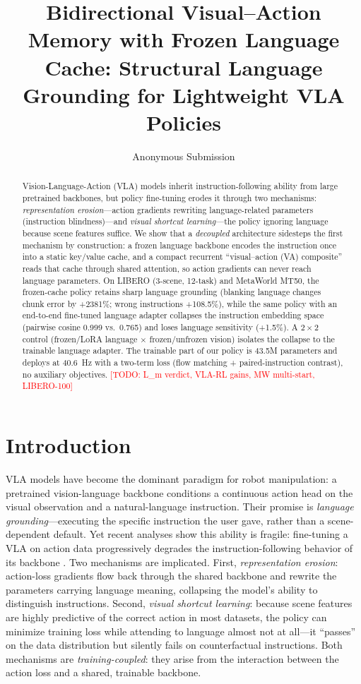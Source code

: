 \documentclass[10pt,twocolumn]{article}
\title{Bidirectional Visual--Action Memory with Frozen Language Cache:
Structural Language Grounding for Lightweight VLA Policies}
\author{Anonymous Submission}
\newcommand{\todo}[1]{\textcolor{red}{[TODO: #1]}}
\begin{document}
\maketitle

\begin{abstract}
Vision-Language-Action (VLA) models inherit instruction-following ability from
large pretrained backbones, but policy fine-tuning erodes it through two
mechanisms: \emph{representation erosion}---action gradients rewriting
language-related parameters (instruction blindness)---and \emph{visual
shortcut learning}---the policy ignoring language because scene features
suffice. We show that a \emph{decoupled} architecture sidesteps the first
mechanism by construction: a frozen language backbone encodes the instruction
once into a static key/value cache, and a compact recurrent
``visual--action (VA) composite'' reads that cache through shared attention,
so action gradients can never reach language parameters. On LIBERO (3-scene,
12-task) and MetaWorld MT50, the frozen-cache policy retains sharp language
grounding (blanking language changes chunk error by +2381\%; wrong
instructions +108.5\%), while the same policy with an end-to-end fine-tuned
language adapter collapses the instruction embedding space (pairwise cosine
0.999 vs.\ 0.765) and loses language sensitivity (+1.5\%). A $2\times2$
control (frozen/LoRA language $\times$ frozen/unfrozen vision) isolates the
collapse to the trainable language adapter. The trainable part of our policy
is 43.5M parameters and deploys at 40.6~Hz with a two-term loss
(flow matching + paired-instruction contrast), no auxiliary objectives.
\todo{L\_m verdict, VLA-RL gains, MW multi-start, LIBERO-100}
\end{abstract}

\section{Introduction}
\label{sec:intro}

VLA models have become the dominant paradigm for robot manipulation: a
pretrained vision-language backbone conditions a continuous action head on the
visual observation and a natural-language instruction. Their promise is
\emph{language grounding}---executing the specific instruction the user gave,
rather than a scene-dependent default. Yet recent analyses show this ability
is fragile: fine-tuning a VLA on action data progressively degrades the
instruction-following behavior of its backbone
\cite{libero_cf,zhang2026flatnesspreservesinstructionfollowing}. Two mechanisms are implicated. First,
\emph{representation erosion}: action-loss gradients flow back through the
shared backbone and rewrite the parameters carrying language meaning,
collapsing the model's ability to distinguish instructions. Second,
\emph{visual shortcut learning}: because scene features are highly predictive
of the correct action in most datasets, the policy can minimize training loss
while attending to language almost not at all---it ``passes'' on the data
distribution but silently fails on counterfactual instructions. Both
mechanisms are \emph{training-coupled}: they arise from the interaction
between the action loss and a shared, trainable backbone.
\end{document}
